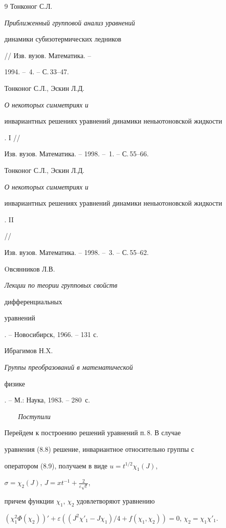 \begin{thebibliography}{9}
Тонконог С.Л. {\em Приближенный групповой анализ уравнений 


динамики субизотермических ледников} // Изв. вузов. Математика. -- 


1994. -- \No\,4. -- С.\,33--47. 




Тонконог С.Л., Эскин Л.Д. {\em О некоторых симметриях и 


инвариантных решениях уравнений динамики неньютоновской жидкости}. I // 


Изв. вузов. Математика. -- 1998. -- \No\,1. -- С.\,55--66. 




Тонконог С.Л., Эскин Л.Д. {\em О некоторых симметриях и 


инвариантных решениях уравнений динамики неньютоновской жидкости}. II 


// 


Изв. вузов. Математика. -- 1998. -- \No\,3. -- С.\,55--62. 




Oвсянников Л.В. {\em Лекции по теории групповых свойств 


дифференциальных 


уравнений}. -- Новосибирск, 1966. -- 131 с. 




Ибрагимов Н.X. {\em Группы преобразований в математической 


физике}. -- М.: Наука, 1983. -- 280~с. 


 


\end{thebibliography} 


 


\vskip 2cm 


 


% 


{$\qquad$\it Поступили} 






\label{end} 


 


 


Перейдем к построению решений уравнений п.\,8. В случае 


уравнения (8.8) решение, инвариантное относительно группы с 


оператором (8.9), получаем в виде $u=t^{1/2}\chi_1(J)$, 


$\sigma=\chi_2(J)$, $J=x t^{-1}+\frac{2}{\varepsilon\sqrt{t}}$, 


причем функции $\chi_1$, $\chi_2$ удовлетворяют уравнению 


$(\chi^2_1\Phi(\chi_2))'+\varepsilon((J^2\chi'_1-J\chi_1)/4+ 


f(\chi_1,\chi_2))=0$, $\chi_2=\chi_1\chi'_1$. 


 


